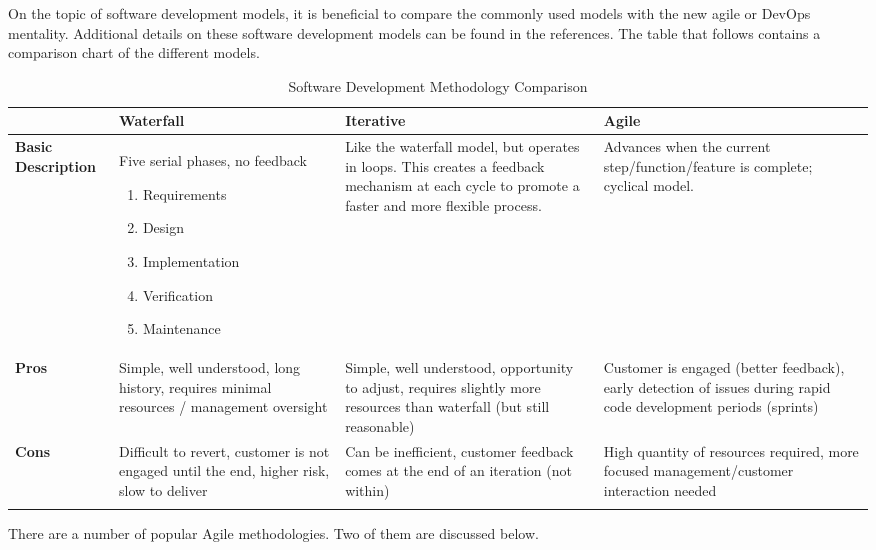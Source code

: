 On the topic of software development models, it is beneficial to compare the
commonly used models with the new agile or DevOps mentality. Additional
details on these software development models can be found in the references. 
The table that follows contains a comparison chart of the different models.

\begin{longtable}{LLLL}
\toprule
&
\textbf{Waterfall}
&
\textbf{Iterative}
&
\textbf{Agile}
\\ \midrule
\textbf{Basic Description}
&
Five serial phases, no feedback
\begin{enumerate}
  \item Requirements
  \item Design
  \item Implementation
  \item Verification
  \item Maintenance
\end{enumerate}
&
Like the waterfall model, but operates in loops. This creates a feedback
mechanism at each cycle to promote a faster and more flexible process.
&
Advances when the current step/function/feature is complete; cyclical model.
\\ \midrule
\textbf{Pros}
&
Simple, well understood, long history, requires minimal resources / management
oversight
&
Simple, well understood, opportunity to adjust, requires slightly more
resources than waterfall (but still reasonable)
&
Customer is engaged (better feedback), early detection of issues during rapid
code development periods (sprints)
\\ \midrule
\textbf{Cons}
&
Difficult to revert, customer is not engaged until the end, higher risk, slow
to deliver
&
Can be inefficient, customer feedback comes at the end of an iteration (not within)
&
High quantity of resources required, more focused management/customer
interaction needed
\\
\bottomrule
\caption{Software Development Methodology Comparison}
\end{longtable}

There are a number of popular Agile methodologies. Two of them are discussed below.

